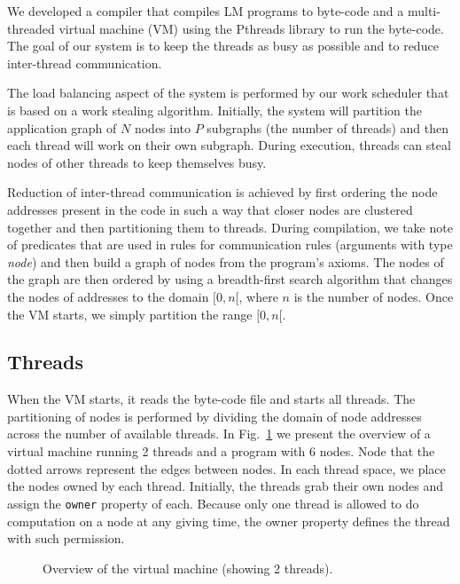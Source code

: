 
We developed a compiler that compiles LM programs to byte-code and a multi-threaded
virtual machine (VM) using the Pthreads library to run the byte-code.
The goal of our system is to keep the threads as busy as possible and to reduce inter-thread communication.

The load balancing aspect of the system is performed by our work scheduler that is based on a work
stealing algorithm. Initially, the system will partition the application
graph of $N$ nodes into $P$ subgraphs (the number of threads) and then each thread will work on their own subgraph.
During execution, threads can steal nodes of other threads to keep themselves busy.

Reduction of inter-thread communication is achieved by first ordering the node addresses present
in the code in such a way that closer nodes are clustered together and then partitioning them
to threads. During compilation, we take note of predicates that are used in rules for
communication rules (arguments with type \emph{node}) and then build a graph of nodes from
the program's axioms. The nodes of the graph are then ordered by using a breadth-first search
algorithm that changes the nodes of addresses to the domain $[0, n[$, where $n$ is the number of
nodes. Once the VM starts, we simply partition the range
$[0, n[$.

\subsection{Threads}

When the VM starts, it reads the byte-code file and starts all threads.
The partitioning of nodes is performed by dividing the domain of node addresses across the number of available threads.
In Fig.~\ref{fig:overview} we present the overview of a virtual machine running 2 threads and a program with 6 nodes.
Node that the dotted arrows represent the edges between nodes. In each thread space, we place the nodes owned by each thread.
Initially, the threads grab their own nodes and assign the \texttt{owner} property of each.
Because only one thread is allowed to do computation on a node at any giving time, the owner property
defines the thread with such permission.

\begin{figure}[ht]
   \centering
   \caption{Overview of the virtual machine (showing 2 threads).}
   \label{fig:overview}
\end{figure}

